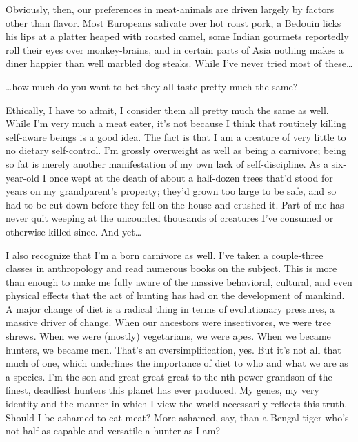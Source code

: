 Obviously, then, our preferences in meat-animals are driven largely by factors other than flavor. Most Europeans salivate over hot roast pork, a Bedouin licks his lips at a platter heaped with roasted camel, some Indian gourmets reportedly roll their eyes over monkey-brains, and in certain parts of Asia nothing makes a diner happier than well marbled dog steaks. While I've never tried most of these\ldots

\ldots how much do you want to bet they all taste pretty much the same?

Ethically, I have to admit, I consider them all pretty much the same as well. While I'm very much a meat eater, it's not because I think that routinely killing self-aware beings is a good idea. The fact is that I am a creature of very little to no dietary self-control. I'm grossly overweight as well as being a carnivore; being so fat is merely another manifestation of my own lack of self-discipline. As a six-year-old I once wept at the death of about a half-dozen trees that'd stood for years on my grandparent's property; they'd grown too large to be safe, and so had to be cut down before they fell on the house and crushed it. Part of me has never quit weeping at the uncounted thousands of creatures I've consumed or otherwise killed since. And yet\ldots

I also recognize that I'm a born carnivore as well. I've taken a couple-three classes in anthropology and read numerous books on the subject. This is more than enough to make me fully aware of the massive behavioral, cultural, and even physical effects that the act of hunting has had on the development of mankind. A major change of diet is a radical thing in terms of evolutionary pressures, a massive driver of change. When our ancestors were insectivores, we were tree shrews. When we were (mostly) vegetarians, we were apes. When we became hunters, we became men. That's an oversimplification, yes. But it's not all that much of one, which underlines the importance of diet to who and what we are as a species. I'm the son and great-great-great to the nth power grandson of the finest, deadliest hunters this planet has ever produced. My genes, my very identity and the manner in which I view the world necessarily reflects this truth. Should I be ashamed to eat meat? More ashamed, say, than a Bengal tiger who's not half as capable and versatile a hunter as I am?

